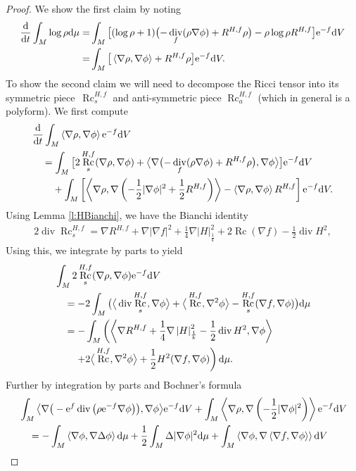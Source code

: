 \documentclass[pdftex]{sigma}
\numberwithin{equation}{section}
\newcommand{\N}{\nabla}
\newcommand{\IP}[1]{\left<#1\right>}
\newcommand{\wnorm}[1]{\left|#1\right|^2_{\frac1k}}
\DeclareMathOperator{\Rc}{Rc}
\DeclareMathOperator{\divg}{div}
\begin{document}
\begin{proof}
	We show the first claim by noting
	\begin{align*}
	\frac{{\rm d}}{{\rm d}t} \int_M \log\rho {\rm d}\mu
	=&\int_M \big[ (\log\rho+1)\bigl(-\divg_f(\rho \N\phi)+R^{H,f}\rho\bigr)-\rho\log\rho R^{H,f} \big] {\rm e}^{-f} {\rm d}V\\
	=&\int_M \big[ \IP{\N\rho,\N\phi}+R^{H,f}\rho \big]{\rm e}^{-f} {\rm d}V.
	\end{align*}
	To show the second claim we will need to decompose the Ricci tensor into its symmetric piece~$\Rc^{H,f}_s$ and anti-symmetric piece $\Rc^{H,f}_a$ (which in general is a polyform). We first compute
	\begin{align*}
	&\frac{{\rm d}}{{\rm d}t} \int_M \IP{\N\rho,\N\phi}{\rm e}^{-f} {\rm d}V\\
&\quad=\int_M \big[ 2\Rc^{H,f}_s(\N\rho,\N\phi) + \big\langle\N\bigl(- \divg_f (\rho \N \phi) +R^{H,f}\rho\bigr),\N \phi\big\rangle \big] {\rm e}^{-f} {\rm d}V \\
	&\quad\phantom{={}}{}+\int_M \left[ \IP{\N\rho,\N \left(-\frac12|\N\phi|^2+\frac12R^{H,f} \right)} - \IP{\N\rho,\N\phi} R^{H,f} \right] {\rm e}^{-f} {\rm d}V.
	\end{align*}
 Using Lemma \ref{l:HBianchi}, we have the Bianchi identity
 \begin{align*}
 	 2\divg \Rc^{H,f}_s=\N R^{H,f}+\N|\N f|^2+\frac1{4}\N\wnorm{H}+2\Rc(\N f)-\frac12\divg H^2,
	\end{align*}
 Using this, we integrate by parts to yield
 \begin{align*}
	&\int_M 2 \Rc^{H,f}_s (\N\rho,\N\phi){\rm e}^{-f} {\rm d}V\\
 &\quad=-2\int_M \big(\big\langle\divg \Rc^{H,f}_s,\N\phi\big\rangle+\big\langle\Rc^{H,f},\N^2\phi\big\rangle- \Rc^{H,f}_s(\N f,\N\phi) \big) {\rm d}\mu\\
	&\quad=-\int_M \left(\IP{\N R^{H,f}+\frac1{4}\N\wnorm{H}-\frac12\divg H^2,\N\phi}\right.\\
&\phantom{\quad={}}{}\left.+2\big\langle\Rc^{H,f},\N^2\phi\big\rangle+\frac12 H^2(\N f,\N\phi) \right) {\rm d}\mu.
\end{align*}
 Further by integration by parts and Bochner's formula
 \begin{align*}
	&\int_M \big\langle\N\big(-{\rm e}^{f}\divg\big(\rho {\rm e}^{-f}\N\phi\big)\big),\N \phi\big\rangle{\rm e}^{-f} {\rm d}V +\int_M \IP{\N\rho,\N\left(-\frac12|\N\phi|^2\right)}{\rm e}^{-f} {\rm d}V\\
	&\quad=-\int_M \IP{\N\phi,\N\Delta\phi} {\rm d}\mu+\frac12\int_M \Delta|\N\phi|^2 {\rm d}\mu +\int_M \IP{\N \phi,\N\IP{\N f,\N\phi}} {\rm d}V\\

\end{align*}
\end{proof}
\end{document}
